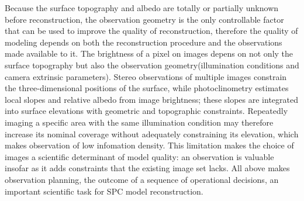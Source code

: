 Because the surface topography and albedo are totally or partially unknown before reconstruction, the observation geometry is the only controllable factor that can be used to improve the quality of reconstruction, therefore the quality of modeling depends on both the reconstruction procedure and the observations made available to it. The brightness of a pixel on images depens on not only the surface topography but also the observation geometry(illumination conditions and camera extrinsic parameters). Stereo observations of multiple images constrain the three-dimensional positions of the surface, while photoclinometry estimates local slopes and relative albedo from image brightness; these slopes are integrated into surface elevations with geometric and topographic constraints. Repeatedly imaging a specific area with the same illumination condition may therefore increase its nominal coverage without adequately constraining its elevation\citep{gaskell2023,palmer2022}, which makes observation of low infomation density. This limitation makes the choice of images a scientific determinant of model quality: an observation is valuable insofar as it adds constraints that the existing image set lacks. All above makes observation planning, the outcome of a sequence of operational decisions, an important scientific task for SPC model reconstruction.

